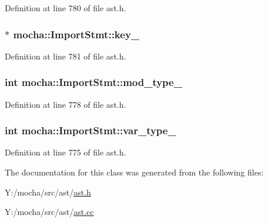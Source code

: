 Definition at line 780 of file ast.h.

\hypertarget{classmocha_1_1_import_stmt_a00ed77461561241ce01f4d71fc4631a4}{
\subsubsection[{key\_\-}]{$\ast$ {\bf mocha::ImportStmt::key\_\-}}}
\label{classmocha_1_1_import_stmt_a00ed77461561241ce01f4d71fc4631a4}


Definition at line 781 of file ast.h.

\hypertarget{classmocha_1_1_import_stmt_a665f283f102a5f348394b3079319e090}{
\subsubsection[{mod\_\-type\_\-}]{\setlength{\rightskip}{0pt plus 5cm}int {\bf mocha::ImportStmt::mod\_\-type\_\-}}}
\label{classmocha_1_1_import_stmt_a665f283f102a5f348394b3079319e090}


Definition at line 778 of file ast.h.

\hypertarget{classmocha_1_1_import_stmt_a2ea5a1ee98a22ed7636ea6731e99894f}{
\subsubsection[{var\_\-type\_\-}]{\setlength{\rightskip}{0pt plus 5cm}int {\bf mocha::ImportStmt::var\_\-type\_\-}}}
\label{classmocha_1_1_import_stmt_a2ea5a1ee98a22ed7636ea6731e99894f}


Definition at line 775 of file ast.h.



The documentation for this class was generated from the following files:\begin{DoxyCompactItemize}
\item 
Y:/mocha/src/ast/\hyperlink{ast_8h}{ast.h}\item 
Y:/mocha/src/ast/\hyperlink{ast_8cc}{ast.cc}\end{DoxyCompactItemize}
